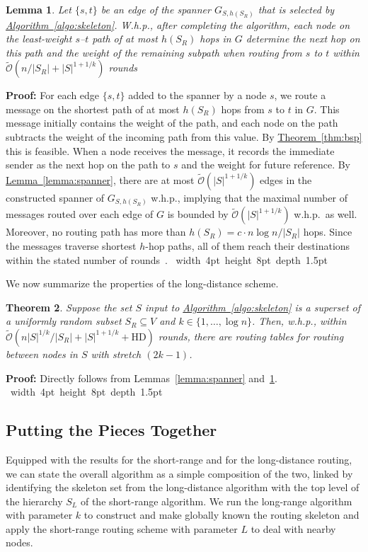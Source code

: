 \documentclass[letterpaper,11pt]{article}
\newcommand{\namedref}[2]{\hyperref[#2]{#1~\ref*{#2}}}
\newcommand{\theoremref}[1]{\namedref{Theorem}{#1}}
\newcommand{\lemmaref}[1]{\namedref{Lemma}{#1}}
\newcommand{\algref}[1]{\namedref{Algorithm}{#1}}
\newtheorem{theorem}{Theorem}[section]
\newtheorem{lemma}[theorem]{Lemma}
\newcommand{\blackslug}{\hbox{\hskip 1pt \vrule width 4pt height 8pt
depth 1.5pt \hskip 1pt}}
\newcommand{\QED}{\quad\blackslug\lower 8.5pt\null\par}
\newenvironment{proof}[1][Proof:]{\noindent \textbf{#1}\xspace}{\QED}
\newcommand{\BO}{\mathcal{O}}
\newcommand{\HD}{\mathrm{HD}}
\begin{document}
\begin{lemma}\label{lemma:spanner_routing}
Let $\{s,t\}$ be an edge of the spanner $G_{S,h(S_R)}$ that is selected by
\algref{algo:skeleton}.  W.h.p., after completing the algorithm, 
each node 
on the least-weight $s$--$t$ path of at most $h(S_R)$ hops in $G$  determine
the next hop on this path and the weight of the remaining subpath when routing
from $s$ to $t$ within $\tilde{\BO}(n/|S_R|+|S|^{1+1/k})$ rounds
\end{lemma}
\begin{proof}
For each edge $\{s,t\}$ added to the spanner by a node $s$, we route a message
on the shortest path of at most $h(S_R)$ hops from $s$ to $t$ in $G$. This
message initially contains the weight of the path, and each node on the path
subtracts the weight of the incoming path from this value. By
\theoremref{thm:bsp} this is feasible. When a node receives the message, it
records the immediate sender as the next hop on the path to $s$ and the weight
for future reference. By \lemmaref{lemma:spanner}, there are at most
$\tilde{\BO}(|S|^{1+1/k})$ edges in the constructed spanner of $G_{S,h(S_R)}$
w.h.p., implying that the maximal number of messages routed over each edge of
$G$ is bounded by $\tilde{\BO}(|S|^{1+1/k})$ w.h.p.\ as well. Moreover, no
routing path has more than $h(S_R)=c\cdot n \log n /|S_R|$ hops. Since the
messages traverse shortest $h$-hop paths, all of them reach their destinations
within the stated number of rounds~\cite{MP-91}.
\end{proof}

We now summarize the properties of the long-distance scheme. 
\begin{theorem}\label{theorem:spanner}
Suppose the set $S$ input to \algref{algo:skeleton} is a superset of a
uniformly random subset $S_R\subseteq V$ and $k\in \{1,\ldots,\log
n\}$. Then, w.h.p., 
within $\tilde{\BO}(n|S|^{1/k}/|S_R|+|S|^{1+1/k}+\HD)$ rounds, there are
routing tables for routing between nodes in $S$ with stretch $(2k-1)$.
\end{theorem}
\begin{proof}
Directly follows from Lemmas~\ref{lemma:spanner}
and~\ref{lemma:spanner_routing}.
\end{proof}


\subsection{Putting the Pieces Together}
\label{sec-tog}
Equipped with the results for the short-range and for the
long-distance routing, we can state the overall algorithm as a simple
composition of the two, linked by identifying the skeleton set from
the long-distance algorithm with the top level of the hierarchy $S_L$
of the short-range algorithm.  We run the long-range algorithm with
parameter $k$ to construct and make globally known the routing
skeleton and apply the short-range routing scheme with parameter $L$
to deal with nearby nodes.
\end{document}
